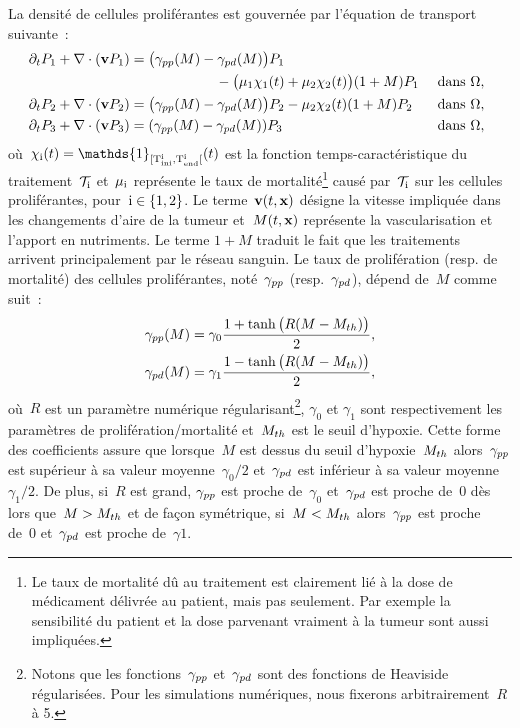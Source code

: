 \documentclass[main.tex]{subfiles}
\begin{document}
La densité de cellules proliférantes est gouvernée par l'équation de transport suivante~:
\begin{align}
\mkern-8mu \partial_t P_1 & + \dive(\vit P_1) = \big(\gammapp(M)- \gammapd(M)\big)P_1 \nonumber \\
 & \hspace{4cm}  - \big(\muI \chiI (t)+\muS \chiS(t) \big)(1+M)P_1 & \textrm{ dans } \Omega, \label{eq_P1}\\
\mkern-8mu \partial_t P_2 &+ \dive(\vit P_2) = \big(\gammapp(M)- \gammapd(M)\big)P_2 - \muS \chiS(t) (1+M)P_2 & \textrm{ dans }  \Omega, \label{eq_P2}\\
\mkern-8mu \partial_t P_3 &+ \dive(\vit P_3) = (\gammapp(M) - \gammapd(M))P_3 & \textrm{ dans }  \Omega, \label{eq_P3}
\end{align}%
où~$\chii(t)=\mathds{1}_{[\Tini{i},\rm \Tend{i}[}(t)$ est la fonction temps-caractéristique du 
traitement~$\mathcal{T}_{\rm i}$ et~$\mu_{\rm i}$ représente le taux de mortalité\footnote{Le taux de mortalité dû au traitement est clairement lié à la dose de médicament délivrée au patient, mais pas seulement. Par exemple la sensibilité du patient et la dose parvenant vraiment à la tumeur sont aussi impliquées.} causé par~$\mathcal{T}_{\rm i}$ sur les cellules proliférantes, pour~$\rm i\in\{1,2\}$. 
Le terme~$\mathbf{v} (t,\mathbf{x})$ désigne la vitesse impliquée dans les changements d'aire de la tumeur et~$M(t,\mathbf{x})$ représente la vascularisation et l'apport en nutriments. 
Le terme $1+M$ traduit le fait que les traitements arrivent principalement par le réseau sanguin. 
Le taux de prolifération (resp. de mortalité) des cellules proliférantes, noté~$\gamma_{pp}$ (resp.~$\gamma_{pd}$), dépend de~$M$ comme suit~:
\begin{align}
\gamma_{pp}(M) &=\gamma_0 \frac{1+\tanh\big(R(M-M_{th})\big)}{2}, \label{eq_gammapp}\\
\gamma_{pd}(M) &=\gamma_1 \frac{1-\tanh\big(R(M-M_{th})\big)}{2}, \label{eq_gammapd}
\end{align}
où~$R$ est un paramètre numérique régularisant\footnote{Notons que les fonctions~$\gamma_{pp}$ et~$\gamma_{pd}$ sont des fonctions de Heaviside régularisées. Pour les simulations numériques, nous fixerons arbitrairement~$R$ à 5.}, $\gamma_0$ et
$\gamma_1$ sont respectivement les paramètres de 
prolifération/mortalité et~$M_{th}$ est le seuil d'hypoxie. 
Cette forme des coefficients assure que lorsque~$M$ est dessus du seuil d'hypoxie~$M_{th}$ alors~$\gamma_{pp}$ est supérieur à sa valeur moyenne~$\gamma_0/2$ et~$\gamma_{pd}$ est inférieur à sa valeur moyenne~$\gamma_1/2$. De plus, si~$R$ est grand, $\gamma_{pp}$ est proche de~$\gamma_0$ et~$\gamma_{pd}$ est proche de~0 dès lors que~$M>M_{th}$ et de façon symétrique, si~$M<M_{th}$ alors~$\gamma_{pp}$ est proche de~0  et~$\gamma_{pd}$ est proche de~$\gamma1$.
\end{document}
